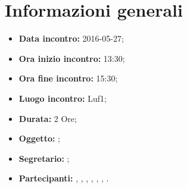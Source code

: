 \newpage
\section{Informazioni generali}
\begin{itemize}
\item \textbf{Data incontro:} 2016-05-27;
\item \textbf{Ora inizio incontro:} 13:30;
\item \textbf{Ora fine incontro:} 15:30;
\item \textbf{Luogo incontro:} Luf1;
\item \textbf{Durata:} 2 Ore;
\item \textbf{Oggetto:} ;
\item \textbf{Segretario:} \GR;
\item \textbf{Partecipanti:} \AF, \FB, \GN, \GR, \MV, \MP, \SM.

\end{itemize}
